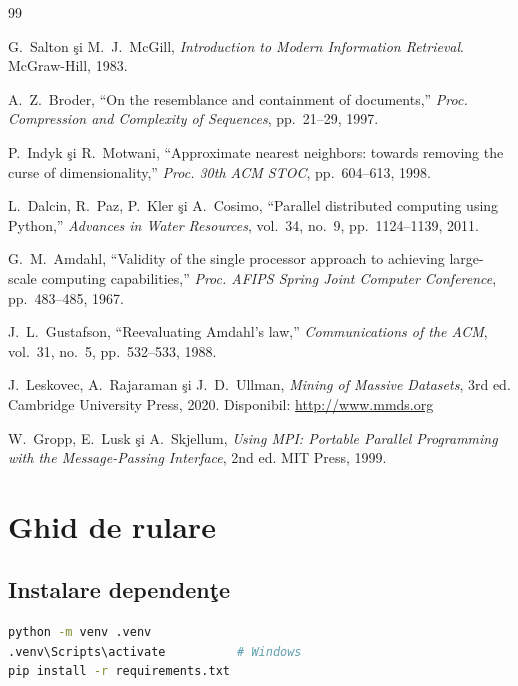 \documentclass[a4paper,12pt]{report}
\begin{document}
\begin{thebibliography}{99}

G.~Salton \c{s}i M.~J.~McGill,
\textit{Introduction to Modern Information Retrieval}.
McGraw-Hill, 1983.

A.~Z.~Broder,
``On the resemblance and containment of documents,''
\textit{Proc. Compression and Complexity of Sequences}, pp.~21--29, 1997.

P.~Indyk \c{s}i R.~Motwani,
``Approximate nearest neighbors: towards removing the curse of dimensionality,''
\textit{Proc. 30th ACM STOC}, pp.~604--613, 1998.

L.~Dalcin, R.~Paz, P.~Kler \c{s}i A.~Cosimo,
``Parallel distributed computing using Python,''
\textit{Advances in Water Resources}, vol.~34, no.~9, pp.~1124--1139, 2011.

G.~M.~Amdahl,
``Validity of the single processor approach to achieving large-scale computing capabilities,''
\textit{Proc. AFIPS Spring Joint Computer Conference}, pp.~483--485, 1967.

J.~L.~Gustafson,
``Reevaluating Amdahl's law,''
\textit{Communications of the ACM}, vol.~31, no.~5, pp.~532--533, 1988.

J.~Leskovec, A.~Rajaraman \c{s}i J.~D.~Ullman,
\textit{Mining of Massive Datasets}, 3rd ed.
Cambridge University Press, 2020.
Disponibil: \url{http://www.mmds.org}

W.~Gropp, E.~Lusk \c{s}i A.~Skjellum,
\textit{Using MPI: Portable Parallel Programming with the Message-Passing Interface}, 2nd ed.
MIT Press, 1999.

\end{thebibliography}

\appendix
\chapter{Ghid de rulare}

\section*{Instalare dependen\c{t}e}
\begin{lstlisting}[language=bash, caption={Instalare mediu virtual}]
python -m venv .venv
.venv\Scripts\activate          # Windows
pip install -r requirements.txt
\end{lstlisting}
\end{document}
